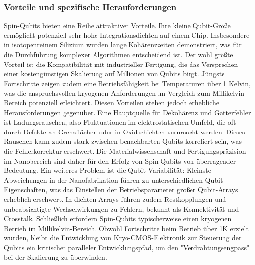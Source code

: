 \subsubsection{Vorteile und spezifische Herauforderungen}
Spin-Qubits bieten eine Reihe attraktiver Vorteile. Ihre kleine Qubit-Größe ermöglicht potenziell sehr hohe Integrationsdichten auf einem Chip\cite{stuyckCMOSCompatibilitySemiconductor2024}.  Insbesondere in isotopenreinem Silizium wurden
lange Kohärenzzeiten demonstriert, was für die Durchführung komplexer Algorithmen entscheidend ist\cite{stuyckCMOSCompatibilitySemiconductor2024}.  Der wohl größte Vorteil ist die
Kompatibilität mit industrieller Fertigung, die das Versprechen einer kostengünstigen Skalierung auf Millionen von Qubits birgt\cite{stuyckCMOSCompatibilitySemiconductor2024}.  Jüngste Fortschritte zeigen zudem eine
Betriebsfähigkeit bei Temperaturen über 1 Kelvin, was die anspruchsvollen kryogenen Anforderungen im Vergleich zum Millikelvin-Bereich potenziell erleichtert\cite{stuyckCMOSCompatibilitySemiconductor2024}. 
Diesen Vorteilen stehen jedoch erhebliche Herausforderungen gegenüber. Eine Hauptquelle für Dekohärenz und Gatterfehler ist Ladungsrauschen, also Fluktuationen im elektrostatischen Umfeld, die oft durch Defekte an Grenzflächen oder in Oxidschichten verursacht werden\cite{stuyckCMOSCompatibilitySemiconductor2024}.  Dieses Rauschen kann zudem stark zwischen benachbarten Qubits korreliert sein, was die Fehlerkorrektur erschwert. Die Materialwissenschaft und Fertigungspräzision im Nanobereich sind daher für den Erfolg von Spin-Qubits von überragender Bedeutung. Ein weiteres Problem ist die
Qubit-Variabilität: Kleinste Abweichungen in der Nanofabrikation führen zu unterschiedlichen Qubit-Eigenschaften, was das Einstellen der Betriebsparameter großer Qubit-Arrays erheblich erschwert. In dichten Arrays führen zudem Restkopplungen und unbeabsichtigte Wechselwirkungen zu Fehlern, bekannt als
Konnektivität und Crosstalk. Schließlich erfordern Spin-Qubits typischerweise einen
kryogenen Betrieb im Millikelvin-Bereich. Obwohl Fortschritte beim Betrieb über 1K erzielt wurden, bleibt die Entwicklung von Kryo-CMOS-Elektronik zur Steuerung der Qubits ein kritischer paralleler Entwicklungspfad, um den "Verdrahtungsengpass" bei der Skalierung zu überwinden\cite{stuyckCMOSCompatibilitySemiconductor2024}. 
